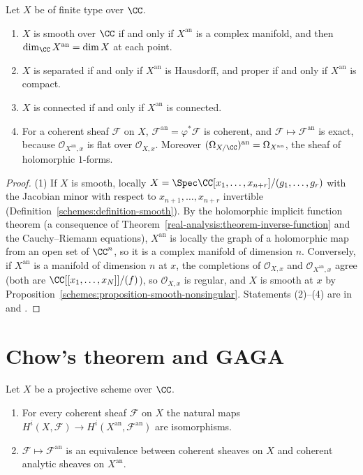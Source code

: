 \begin{proposition}\label{gaga:proposition-analytification-properties}
Let $X$ be of finite type over $\CC$.
\begin{enumerate}
\item $X$ is smooth over $\CC$ if and only if $X^{\mathrm{an}}$ is a complex manifold, and then $\dim_\CC X^{\mathrm{an}} = \dim X$ at each point.
\item $X$ is separated if and only if $X^{\mathrm{an}}$ is Hausdorff, and proper if and only if $X^{\mathrm{an}}$ is compact.
\item $X$ is connected if and only if $X^{\mathrm{an}}$ is connected.
\item For a coherent sheaf $\mathcal{F}$ on $X$, $\mathcal{F}^{\mathrm{an}} = \varphi^*\mathcal{F}$ is coherent, and $\mathcal{F} \mapsto \mathcal{F}^{\mathrm{an}}$ is exact, because
$\mathcal{O}_{X^{\mathrm{an}}, x}$ is flat over $\mathcal{O}_{X,x}$. Moreover $(\Omega_{X/\CC})^{\mathrm{an}} = \Omega_{X^{\mathrm{an}}}$, the sheaf of holomorphic $1$-forms.
\end{enumerate}
\end{proposition}

\begin{proof}
(1) If $X$ is smooth, locally $X = \Spec\CC[x_1, \ldots, x_{n+r}]/(g_1, \ldots, g_r)$ with the Jacobian minor with respect to $x_{n+1}, \ldots, x_{n+r}$ invertible
(Definition~\ref{schemes:definition-smooth}). By the holomorphic implicit function theorem (a consequence of Theorem~\ref{real-analysis:theorem-inverse-function}
and the Cauchy--Riemann equations), $X^{\mathrm{an}}$ is locally the graph of a holomorphic map from an open set of $\CC^n$, so it is a complex manifold of dimension
$n$. Conversely, if $X^{\mathrm{an}}$ is a manifold of dimension $n$ at $x$, the completions of $\mathcal{O}_{X,x}$ and $\mathcal{O}_{X^{\mathrm{an}},x}$ agree (both are
$\CC[[x_1, \ldots, x_N]]/(f)$), so $\mathcal{O}_{X,x}$ is regular, and $X$ is smooth at $x$ by Proposition~\ref{schemes:proposition-smooth-nonsingular}. Statements (2)--(4)
are in \cite[Expos\'e XII]{sga1} and \cite[Section 2]{serre-gaga}.
\end{proof}

\section{Chow's theorem and GAGA}\label{gaga:section-gaga}

\begin{theorem}\label{gaga:theorem-gaga}
Let $X$ be a projective scheme over $\CC$.
\begin{enumerate}
\item For every coherent sheaf $\mathcal{F}$ on $X$ the natural maps $H^i(X, \mathcal{F}) \to H^i(X^{\mathrm{an}}, \mathcal{F}^{\mathrm{an}})$ are isomorphisms.
\item $\mathcal{F} \mapsto \mathcal{F}^{\mathrm{an}}$ is an equivalence between coherent sheaves on $X$ and coherent analytic sheaves on $X^{\mathrm{an}}$.
\end{enumerate}
\end{theorem}

